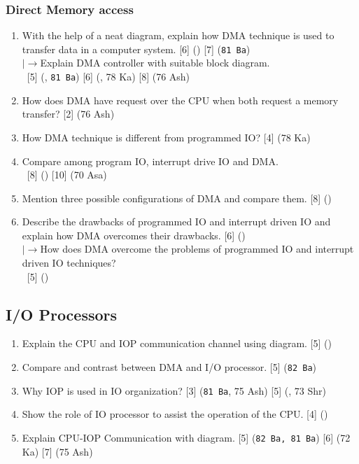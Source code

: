 \documentclass[12pt]{article}
\newcommand{\lb}{\\$\left|\rightarrow\right.$}
\newcommand{\enter}{\\\textcolor{white}{1}}
\begin{document}
	\subsubsection{Direct Memory access}
		\begin{enumerate}
			\item With the help of a neat diagram, explain how DMA technique is used to transfer data in a computer system. \hfill [6] () [7] (\texttt{81 Ba})
			\lb Explain DMA controller with suitable block diagram.
			\enter\hfill [5] (, \texttt{81 Ba}) [6] (, 78 Ka) [8] (76 Ash)

			\item How does DMA have request over the CPU when both request a memory transfer? \hfill [2] (76 Ash)

			\item How DMA technique is different from programmed IO? \hfill [4] (78 Ka)

			\item Compare among program IO, interrupt drive IO and DMA.
			\enter\hfill [8] () [10] (70 Asa)

			\item Mention three possible configurations of DMA and compare them. \hfill [8] ()
				
			\item Describe the drawbacks of programmed IO and interrupt driven IO and explain how DMA overcomes their drawbacks. \hfill [6] ()
			\lb How does DMA overcome the problems of programmed IO and interrupt driven IO techniques?
			\enter\hfill [5] ()
		\end{enumerate}

	\subsection{I/O Processors}
		\begin{enumerate}
			\item Explain the CPU and IOP communication channel using diagram. \hfill [5] ()
			
			\item Compare and contrast between DMA and I/O processor. \hfill [5] (\texttt{82 Ba})

			\item Why IOP is used in IO organization? \hfill [3] (\texttt{81 Ba}, 75 Ash) [5] (, 73 Shr)

			\item Show the role of IO processor to assist the operation of the CPU. \hfill [4] ()
			
			\item Explain CPU-IOP Communication with diagram. \hfill [5] (\texttt{82 Ba, 81 Ba}) [6] (72 Ka) [7] (75 Ash)
		\end{enumerate}
\end{document}
